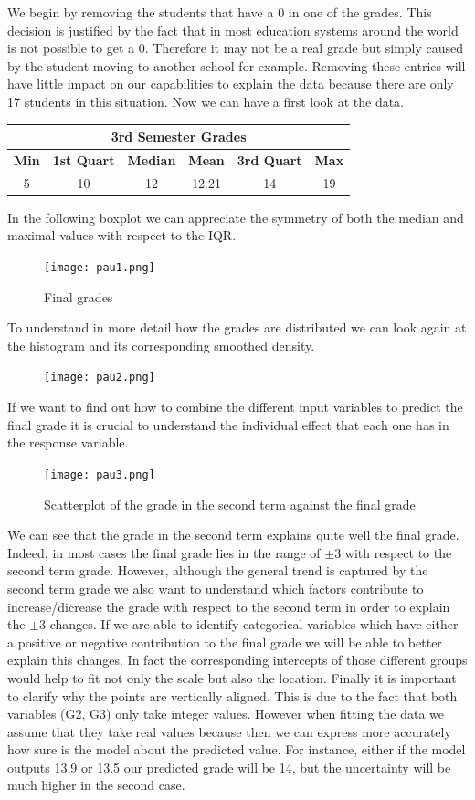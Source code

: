 \documentclass[a4paper, 11pt]{report}
\theoremstyle{definition}
\numberwithin{equation}{section}		%
\numberwithin{figure}{section}			%
\numberwithin{table}{section}				%
\begin{document}
We begin by removing the students that have a 0 in one of the grades. This decision is justified by the fact that in most education systems around the world is not possible to get a 0. Therefore it may not be a real grade but simply caused by the student moving to another school for example.  Removing these entries will have little impact on our capabilities to explain the data because there are only 17 students in this situation. Now we can have a first look at the data.\bigskip
\begin{center}
\begin{tabular}{ |c|c|c|c|c|c|  }
 \hline
 \multicolumn{6}{|c|}{3rd Semester Grades} \\
 \hline
\textbf{Min} & \textbf{1st Quart} & \textbf{Median} & \textbf{Mean} &  \textbf{3rd Quart} & \textbf{Max}\\
\hline
 5   & 10   & 12 &  12.21 &14&   19\\
 \hline
\end{tabular}
\end{center}
\bigskip In the following boxplot we can appreciate the symmetry of both the median and maximal values with respect to the IQR.
\begin{figure}[h]\centering
\texttt{[image: pau1.png]}
\caption{Final grades}
\end{figure}
\newpage
To understand in more detail how the grades are distributed we can look again at the histogram and  its corresponding smoothed density. \bigskip
\begin{figure}[h]\centering
\texttt{[image: pau2.png]}
\end{figure}
If we want to find out how to combine the different input variables to predict the final grade it is crucial to understand the individual effect that each one has in the response variable.
\begin{figure}[h]\centering
\texttt{[image: pau3.png]}
\caption{Scatterplot of the grade in the second term against the final grade}
\end{figure}
\newline
We can see that the grade in the second term explains quite well the final grade. Indeed, in most cases the final grade lies in the range of $\pm 3$ with respect to the second term grade. However, although the general trend is captured by the second term grade we also want to understand which factors contribute to increase/dicrease the grade with respect to the second term in order to explain the $\pm 3$ changes. If we are able to identify categorical variables which have either a positive or negative contribution to the final grade we will be able to better explain this changes. In fact the corresponding intercepts of those different groups would help to fit not only the scale but also the location.
Finally it is important to clarify why the points are vertically aligned. This is due to the fact that both variables (G2, G3) only take integer values. However when fitting the data we assume that they take real values because then we can express more accurately how sure is the model about the predicted value. For instance, either if the model outputs 13.9 or 13.5 our predicted grade will be 14, but the uncertainty will be much higher in the second case.\bigskip
\end{document}
